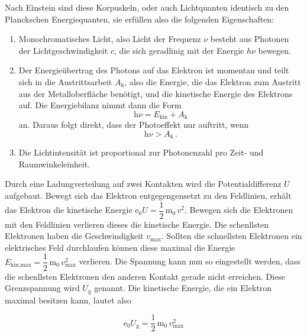 Nach Einstein sind diese Korpuskeln, oder auch Lichtquanten identisch zu den Planckschen Energiequanten,
sie erfüllen also die folgenden Eigenschaften:

\begin{enumerate}
    \item Monochromatisches Licht, also Licht der Frequenz $\nu$ besteht aus Photonen der Lichtgeschwindigkeit $c$,
            die sich geradlinig mit der Energie $h\nu$ bewegen.
    \item Der Energieübertrag des Photons auf das Elektron ist momentan und teilt sich in die Austrittsarbeit $A_\text{k}$, 
            also die Energie, die das Elektron zum Austritt aus der Metalloberfläche benötigt, 
            und die kinetische Energie des Elektrons auf. Die Energiebilanz nimmt dann die 
            Form
            \begin{equation}
                \text{h} \nu = E_\text{kin} + A_\text{k}
                \label{eq:energiebilanz}
            \end{equation}
            an.
            Daraus folgt direkt, dass der Photoeffekt nur auftritt, wenn
            \begin{equation*}
                \text{h} \nu > A_\text{k} \,.
            \end{equation*}
    \item Die Lichtintensität ist proportional zur Photonenzahl pro Zeit- und Raumwinkeleinheit.
\end{enumerate}

Durch eine Ladungverteilung auf zwei Kontakten wird die Potentialdifferenz $U$ aufgebaut.
Bewegt sich das Elektron entgegengensetzt zu den Feldlinien, erhält das Elektron die kinetische Energie $\text{e}_0 U = \dfrac{1}{2} \, \text{m}_0 \, v^2 $.
Bewegen sich die Elektronen mit den Feldlinien verlieren dieses die kinetische Energie.
Die schenllsten Elektronen haben die Geschwindigkeit $v_\text{max}$. 
Sollten die schnellsten Elektronen ein elektrisches Feld durchlaufen können diese maximal die Energie $E_\text{kin,max} = \dfrac{1}{2} \, \text{m}_0 \, v^2_\text{max}$ verlieren.
Die Spannung kann nun so eingestellt werden, dass die schenllsten Elektronen den anderen Kontakt gerade nicht erreichen.
Diese Grenzspannung wird $U_\text{g}$ genannt. Die kinetische Energie, die ein Elektron maximal besitzen kann, lautet also

\begin{equation*}
    \text{e}_0 U_\text{g} = \dfrac{1}{2} \, \text{m}_0 \, v^2_\text{max}
\end{equation*}

